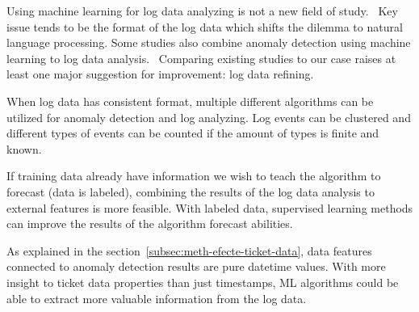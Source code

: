 Using machine learning for log data analyzing
is not a new field of study.~\cite{rantala2019applying,allagi2019analysis,kondo2017early,cao2017machine}
Key issue tends to be the format of the log data
which shifts the dilemma to natural language processing.
Some studies also combine anomaly detection using machine learning
to log data analysis.~\cite{liu2019loganomaly, zhang2019robust}
Comparing existing studies to our case
raises at least one major suggestion for improvement:
log data refining.

When log data has consistent format,
multiple different algorithms can be utilized
for anomaly detection and log analyzing.
Log events can be clustered
and different types of events can be counted
if the amount of types is finite and known.~\cite{liu2019loganomaly}

If training data already have information
we wish to teach the algorithm to forecast (\ie data is labeled),
combining the results of the log data analysis to external features
is more feasible.
With labeled data,
supervised learning methods can improve the results of the algorithm forecast abilities.
~\cite{rantala2019applying}

As explained in the section~\ref{subsec:meth-efecte-ticket-data},
data features connected to anomaly detection results
are pure datetime values.
With more insight to ticket data properties than just timestamps,
ML algorithms could be able to extract more valuable information
from the log data.


\clearpage